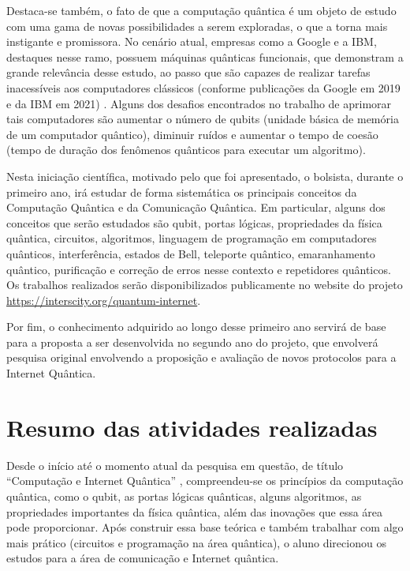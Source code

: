 \documentclass{article}
\begin{document}
	Destaca-se também, o fato de que a computação quântica é um objeto de estudo com uma gama de novas possibilidades a serem exploradas, o que a torna mais instigante e promissora. No cenário atual, empresas como a Google e a IBM, destaques nesse ramo, possuem máquinas quânticas funcionais, que demonstram a grande relevância desse estudo, ao passo que são capazes de realizar tarefas inacessíveis aos computadores clássicos (conforme publicações da Google em 2019 e da IBM em 2021) . Alguns dos desafios encontrados no trabalho de aprimorar tais computadores são aumentar o número de qubits (unidade básica de memória de um computador quântico), diminuir ruídos e aumentar o tempo de coesão (tempo de duração dos fenômenos quânticos para executar um algoritmo).
 
	Nesta iniciação científica, motivado pelo que foi apresentado, o bolsista, durante o primeiro ano, irá estudar de forma sistemática os principais conceitos da Computação Quântica e da Comunicação Quântica. Em particular, alguns dos  conceitos que serão estudados são qubit, portas lógicas, propriedades da física quântica, circuitos, algoritmos, linguagem de programação em computadores quânticos, interferência, estados de Bell, teleporte quântico, emaranhamento quântico, purificação e correção de erros nesse contexto e repetidores quânticos. Os trabalhos realizados serão disponibilizados publicamente no website do projeto \href{https://interscity.org/quantum-internet/}{https://interscity.org/quantum-internet}.
 
	Por fim, o conhecimento adquirido ao longo desse primeiro ano servirá de base para a proposta a ser desenvolvida no segundo ano do projeto, que envolverá pesquisa original envolvendo a proposição e avaliação de novos protocolos para a Internet Quântica.

\newpage

\section{Resumo das atividades realizadas}
    Desde o início até o momento atual da pesquisa em questão, de título ``Computação e Internet Quântica'' , compreendeu-se os princípios da computação quântica, como o qubit, as portas lógicas quânticas, alguns algoritmos, as propriedades importantes da física quântica, além das inovações que essa área  pode proporcionar. Após construir essa base teórica e também trabalhar com algo mais prático (circuitos e programação na área quântica), o aluno direcionou os estudos para a área de comunicação e Internet quântica.
\end{document}
